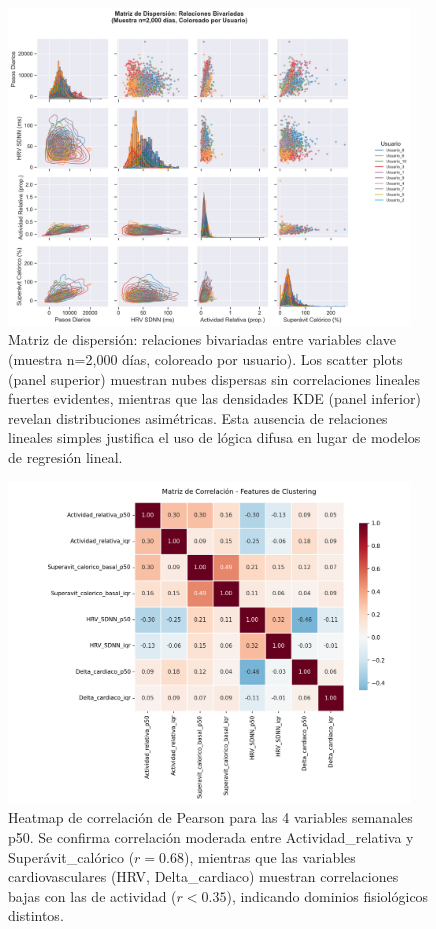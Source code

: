 \documentclass[12pt,letterpaper,twoside]{report}
\begin{document}
\begin{figure}[htbp]
\centering
\includegraphics[width=0.95\textwidth]{../analisis_u/descriptivos_visuales/scatter_matrix_relaciones.png}
\caption{Matriz de dispersión: relaciones bivariadas entre variables clave (muestra n=2,000 días, coloreado por usuario). Los scatter plots (panel superior) muestran nubes dispersas sin correlaciones lineales fuertes evidentes, mientras que las densidades KDE (panel inferior) revelan distribuciones asimétricas. Esta ausencia de relaciones lineales simples justifica el uso de lógica difusa en lugar de modelos de regresión lineal.}
\label{fig:scatter_matrix}
\end{figure}

\begin{figure}[htbp]
\centering
\includegraphics[width=0.95\textwidth]{../analisis_u/semanal/precluster/features_correlacion_heatmap.png}
\caption{Heatmap de correlación de Pearson para las 4 variables semanales p50. Se confirma correlación moderada entre Actividad\_relativa y Superávit\_calórico ($r=0.68$), mientras que las variables cardiovasculares (HRV, Delta\_cardiaco) muestran correlaciones bajas con las de actividad ($r < 0.35$), indicando dominios fisiológicos distintos.}
\label{fig:features_correlacion_heatmap}
\end{figure}
\end{document}
